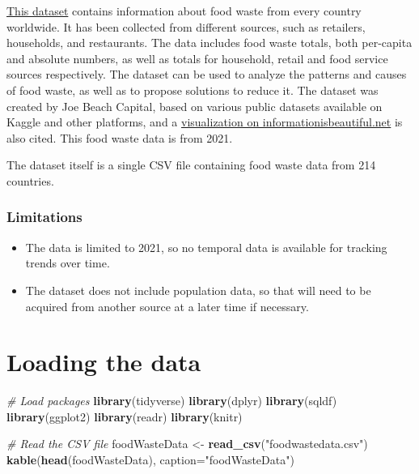 \documentclass[
]{article}
\newenvironment{Shaded}{\begin{snugshade}}{\end{snugshade}}
\newcommand{\AttributeTok}[1]{\textcolor[rgb]{0.13,0.29,0.53}{#1}}
\newcommand{\CommentTok}[1]{\textcolor[rgb]{0.56,0.35,0.01}{\textit{#1}}}
\newcommand{\FunctionTok}[1]{\textcolor[rgb]{0.13,0.29,0.53}{\textbf{#1}}}
\newcommand{\NormalTok}[1]{#1}
\newcommand{\OtherTok}[1]{\textcolor[rgb]{0.56,0.35,0.01}{#1}}
\newcommand{\StringTok}[1]{\textcolor[rgb]{0.31,0.60,0.02}{#1}}
\providecommand{\tightlist}{%
  \setlength{\itemsep}{0pt}\setlength{\parskip}{0pt}}
\begin{document}
\href{https://www.kaggle.com/datasets/joebeachcapital/food-waste}{This
dataset} contains information about food waste from every country
worldwide. It has been collected from different sources, such as
retailers, households, and restaurants. The data includes food waste
totals, both per-capita and absolute numbers, as well as totals for
household, retail and food service sources respectively. The dataset can
be used to analyze the patterns and causes of food waste, as well as to
propose solutions to reduce it. The dataset was created by Joe Beach
Capital, based on various public datasets available on Kaggle and other
platforms, and a
\href{https://informationisbeautiful.net/visualizations/food-waste/}{visualization
on informationisbeautiful.net} is also cited. This food waste data is
from 2021.

The dataset itself is a single CSV file containing food waste data from
214 countries.

\hypertarget{limitations}{%
\subsubsection{Limitations}\label{limitations}}

\begin{itemize}
\tightlist
\item
  The data is limited to 2021, so no temporal data is available for
  tracking trends over time.
\item
  The dataset does not include population data, so that will need to be
  acquired from another source at a later time if necessary.
\end{itemize}

\hypertarget{loading-the-data}{%
\section{Loading the data 🔄}\label{loading-the-data}}

\begin{Shaded}
\begin{Highlighting}[]
\CommentTok{\# Load packages}
\FunctionTok{library}\NormalTok{(tidyverse)}
\FunctionTok{library}\NormalTok{(dplyr)}
\FunctionTok{library}\NormalTok{(sqldf)}
\FunctionTok{library}\NormalTok{(ggplot2)}
\FunctionTok{library}\NormalTok{(readr)}
\FunctionTok{library}\NormalTok{(knitr)}

\CommentTok{\# Read the CSV file}
\NormalTok{foodWasteData }\OtherTok{\textless{}{-}} \FunctionTok{read\_csv}\NormalTok{(}\StringTok{"foodwastedata.csv"}\NormalTok{)}
\FunctionTok{kable}\NormalTok{(}\FunctionTok{head}\NormalTok{(foodWasteData), }\AttributeTok{caption=}\StringTok{"foodWasteData"}\NormalTok{)}
\end{Highlighting}
\end{Shaded}
\end{document}
